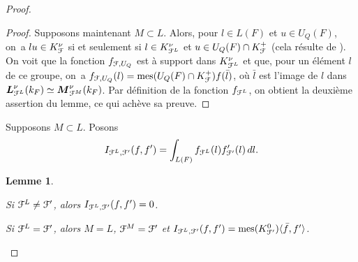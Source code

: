 \documentclass[11pt]{article}
\newcommand{\skpt}{\smallskip}
\numberwithin{equation}{section}\providecommand{\og}{«\,}\providecommand{\fg}{\,»}
\let\mathcal \EuScript
\let\oldenumerate\enumerate
\renewcommand{\enumerate}{\oldenumerate\itemindent0pt}
\newenvironment{enumeratei}
{\bgroup\def\theenumi{\roman{enumi}}\def\theenumii{\arabic{enumii}}\oldenumerate}
{\endenumerate\egroup}
\let\<\langle
\let\>\rangle
\DeclareMathOperator{\mes}{mes}
\newcommand{\bL}{\boldsymbol{L}}
\newcommand{\bM}{\boldsymbol{M}}
\newcommand{\cF}{\mathcal{F}}
\theoremstyle{plain}
\newtheorem{lem}{Lemme}
\theoremstyle{definition}
\begin{document}
\begin{proof}
\begin{proof}
Supposons maintenant $M\subset L$. Alors, pour $l\in L(F)$ et $u\in U_{Q}(F)$, on~a $lu\in K_{\cF}^{\nu}$ si et seulement si $l\in K_{\cF^L}^{\nu}$ et $u\in U_{Q}(F)\cap K_{\cF}^+$ (cela résulte de \cite[Lem.\,6]{W2}). On voit que la fonction $f_{\cF,U_{Q}}$ est à support dans $K_{\cF^L}^{\nu}$ et que, pour un élément $l$ de ce groupe, on~a $f_{\cF,U_{Q}}(l)=\mes(U_{Q}(F)\cap K_{\cF}^+)f(\bar{l})$, où $\bar{l}$ est l'image de $l$ dans $\bL_{\cF^L}^{\nu}(k_{F})\simeq \bM_{\cF^M}^{\nu}(k_{F})$. Par définition de la fonction $f_{\cF^L}$, on obtient la deuxième assertion du lemme, ce qui achève sa preuve.
\end{proof}

Supposons $M\subset L$. Posons
\[
I_{\cF^L,\cF'}(f,f')=\int_{L(F)}f_{\cF^L}(l)f'_{\cF'}(l)\, dl.
\]

\skpt
\begin{lem}\label{lem2}
\begin{enumeratei}
\item\label{lem2i}
Si
$\cF^L\neq\cF'$, alors $I_{\cF^L,\cF'}(f,f')=0$.

\item\label{lem2ii}
Si $\cF^L=\cF'$, alors $M=L$, $\cF^M=\cF'$ et $I_{\cF^L,\cF'}(f,f')=\mes(K_{\cF'}^0)\<\bar{f},f'\>$.
\end{enumeratei}
\end{lem}


\end{proof}
\end{document}
